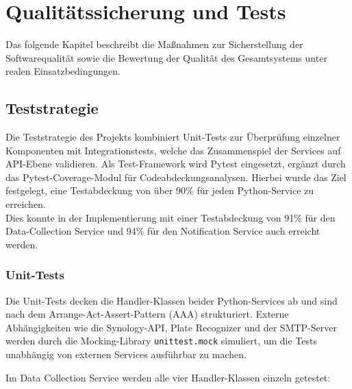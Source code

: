 \section{Qualitätssicherung und Tests}
\label{sec:qualitaetssicherung}

Das folgende Kapitel beschreibt die Maßnahmen zur Sicherstellung der Softwarequalität sowie die Bewertung der Qualität des Gesamtsystems unter realen Einsatzbedingungen.


\subsection{Teststrategie}

Die Teststrategie des Projekts kombiniert Unit-Tests zur Überprüfung einzelner Komponenten mit Integrationstests, welche das Zusammenspiel der Services auf API-Ebene validieren.
Als Test-Framework wird Pytest \cite{pytest} eingesetzt, ergänzt durch das Pytest-Coverage-Modul \cite{pytest_cov} für Codeabdeckungsanalysen.
Hierbei wurde das Ziel festgelegt, eine Testabdeckung von über 90\% für jeden Python-Service zu erreichen. \\
Dies konnte in der Implementierung mit einer Testabdeckung von 91\% für den Data-Collection Service und 94\% für den Notification Service auch erreicht werden.


\subsubsection{Unit-Tests}

Die Unit-Tests decken die Handler-Klassen beider Python-Services ab und sind nach dem Arrange-Act-Assert-Pattern (AAA) strukturiert.
Externe Abhängigkeiten wie die Synology-API, Plate Recognizer und der SMTP-Server werden durch die Mocking-Library \texttt{unittest.mock} simuliert, um die Tests unabhängig von externen Services ausführbar zu machen.

Im Data Collection Service werden alle vier Handler-Klassen einzeln getestet:


